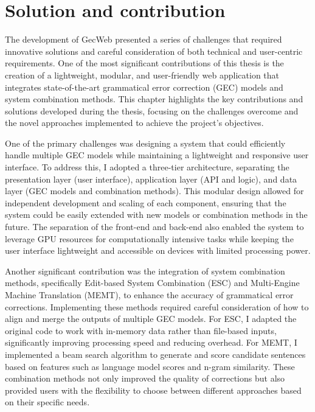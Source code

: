 \chapter{Solution and contribution}
\label{chapter:contribution}

The development of GecWeb presented a series of challenges that required innovative solutions and careful consideration of both technical and user-centric requirements.
One of the most significant contributions of this thesis is the creation of a lightweight, modular, and user-friendly web application that integrates state-of-the-art grammatical error correction (GEC) models and system combination methods.
This chapter highlights the key contributions and solutions developed during the thesis, focusing on the challenges overcome and the novel approaches implemented to achieve the project's objectives.

One of the primary challenges was designing a system that could efficiently handle multiple GEC models while maintaining a lightweight and responsive user interface.
To address this, I adopted a three-tier architecture, separating the presentation layer (user interface), application layer (API and logic), and data layer (GEC models and combination methods).
This modular design allowed for independent development and scaling of each component, ensuring that the system could be easily extended with new models or combination methods in the future.
The separation of the front-end and back-end also enabled the system to leverage GPU resources for computationally intensive tasks while keeping the user interface lightweight and accessible on devices with limited processing power.

Another significant contribution was the integration of system combination methods, specifically Edit-based System Combination (ESC) and Multi-Engine Machine Translation (MEMT), to enhance the accuracy of grammatical error corrections.
Implementing these methods required careful consideration of how to align and merge the outputs of multiple GEC models.
For ESC, I adapted the original code to work with in-memory data rather than file-based inputs, significantly improving processing speed and reducing overhead.
For MEMT, I implemented a beam search algorithm to generate and score candidate sentences based on features such as language model scores and n-gram similarity.
These combination methods not only improved the quality of corrections but also provided users with the flexibility to choose between different approaches based on their specific needs.

